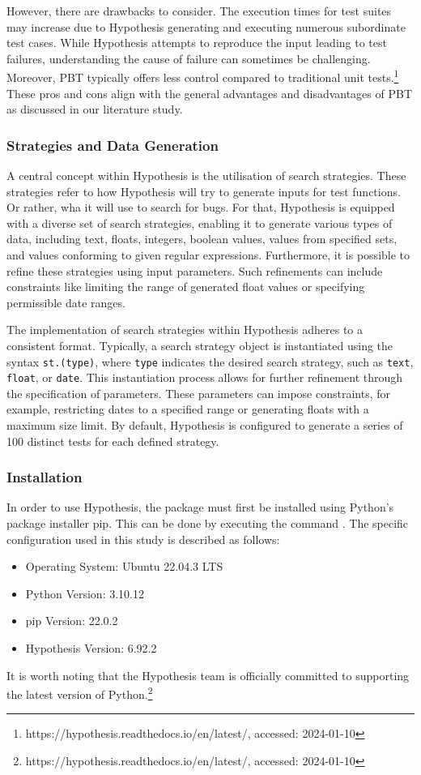 \documentclass[runningheads]{llncs}
\begin{document}
However, there are drawbacks to consider. The execution times for test suites may increase due to Hypothesis generating and executing numerous subordinate test cases. While Hypothesis attempts to reproduce the input leading to test failures, understanding the cause of failure can sometimes be challenging. Moreover, PBT typically offers less control compared to traditional unit tests.\footnote{https://hypothesis.readthedocs.io/en/latest/, accessed: 2024-01-10} These pros and cons align with the general advantages and disadvantages of PBT as discussed in our literature study.

\subsubsection{Strategies and Data Generation}
A central concept within Hypothesis is the utilisation of search strategies. These strategies refer to how Hypothesis will try to generate inputs for test functions. Or rather, wha it will use to search for bugs. For that, Hypothesis is equipped with a diverse set of search strategies, enabling it to generate various types of data, including text, floats, integers, boolean values, values from specified sets, and values conforming to given regular expressions. Furthermore, it is possible to refine these strategies using input parameters. Such refinements can include constraints like limiting the range of generated float values or specifying permissible date ranges.

The implementation of search strategies within Hypothesis adheres to a consistent format. Typically, a search strategy object is instantiated using the syntax \texttt{st.(type)}, where \texttt{type} indicates the desired search strategy, such as \texttt{text}, \texttt{float}, or \texttt{date}. This instantiation process allows for further refinement through the specification of parameters. These parameters can impose constraints, for example, restricting dates to a specified range or generating floats with a maximum size limit. By default, Hypothesis is configured to generate a series of 100 distinct tests for each defined strategy.

\subsubsection{Installation}
In order to use Hypothesis, the package must first be installed using Python's package installer pip. This can be done by executing the command . The specific configuration used in this study is described as follows:
\begin{itemize}
  \item Operating System: Ubuntu 22.04.3 LTS
  \item Python Version: 3.10.12
  \item pip Version: 22.0.2
  \item Hypothesis Version: 6.92.2
\end{itemize}
It is worth noting that the Hypothesis team is officially committed to supporting the latest version of Python.\footnote{https://hypothesis.readthedocs.io/en/latest/, accessed: 2024-01-10}
\end{document}
